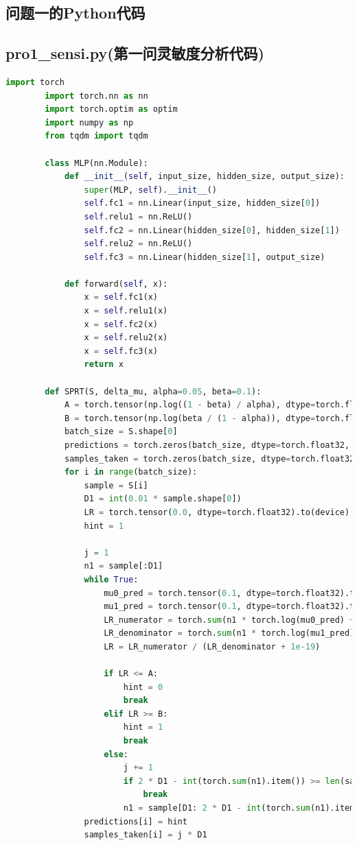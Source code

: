 \documentclass[withoutpreface,bwprint]{cumcmthesis} %
\begin{document}
\begin{appendices}
	\section{问题一的Python代码}
\subsection{pro1\_sensi.py(第一问灵敏度分析代码)}
	\begin{lstlisting}[language=python]
		import torch
		import torch.nn as nn
		import torch.optim as optim
		import numpy as np
		from tqdm import tqdm
		
		class MLP(nn.Module):
			def __init__(self, input_size, hidden_size, output_size):
				super(MLP, self).__init__()
				self.fc1 = nn.Linear(input_size, hidden_size[0])
				self.relu1 = nn.ReLU()
				self.fc2 = nn.Linear(hidden_size[0], hidden_size[1])
				self.relu2 = nn.ReLU()
				self.fc3 = nn.Linear(hidden_size[1], output_size)
		
			def forward(self, x):
				x = self.fc1(x)
				x = self.relu1(x)
				x = self.fc2(x)
				x = self.relu2(x)
				x = self.fc3(x)
				return x
		
		def SPRT(S, delta_mu, alpha=0.05, beta=0.1):
			A = torch.tensor(np.log((1 - beta) / alpha), dtype=torch.float32).to(device)
			B = torch.tensor(np.log(beta / (1 - alpha)), dtype=torch.float32).to(device)
			batch_size = S.shape[0]
			predictions = torch.zeros(batch_size, dtype=torch.float32, requires_grad=True).to(device)
			samples_taken = torch.zeros(batch_size, dtype=torch.float32).to(device)
			for i in range(batch_size):
				sample = S[i]
				D1 = int(0.01 * sample.shape[0]) 
				LR = torch.tensor(0.0, dtype=torch.float32).to(device)
				hint = 1  
		
				j = 1 
				n1 = sample[:D1]
				while True:  
					mu0_pred = torch.tensor(0.1, dtype=torch.float32).to(device) + delta_mu[0]
					mu1_pred = torch.tensor(0.1, dtype=torch.float32).to(device) - delta_mu[1]
					LR_numerator = torch.sum(n1 * torch.log(mu0_pred) + (1 - n1) * torch.log(1 - mu0_pred))
					LR_denominator = torch.sum(n1 * torch.log(mu1_pred) + (1 - n1) * torch.log(1 - mu1_pred))
					LR = LR_numerator / (LR_denominator + 1e-19)
		
					if LR <= A:
						hint = 0
						break
					elif LR >= B:
						hint = 1
						break
					else:
						j += 1
						if 2 * D1 - int(torch.sum(n1).item()) >= len(sample):
							break  
						n1 = sample[D1: 2 * D1 - int(torch.sum(n1).item())]
				predictions[i] = hint
				samples_taken[i] = j * D1 
		

\end{lstlisting}
\end{appendices}
\end{document}
